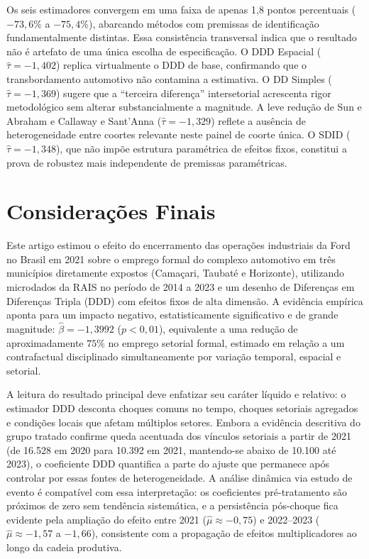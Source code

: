 \documentclass[12pt,a4paper]{article}
\begin{document}
Os seis estimadores convergem em uma faixa de apenas 1{,}8 pontos percentuais ($-73{,}6\%$ a $-75{,}4\%$), abarcando m\'etodos com premissas de identifica\c{c}\~ao fundamentalmente distintas. Essa consist\^encia transversal indica que o resultado n\~ao \'e artefato de uma \'unica escolha de especifica\c{c}\~ao. O DDD Espacial ($\hat{\tau} = -1{,}402$) replica virtualmente o DDD de base, confirmando que o transbordamento automotivo n\~ao contamina a estimativa. O DD Simples ($\hat{\tau} = -1{,}369$) sugere que a ``terceira diferen\c{c}a'' intersetorial acrescenta rigor metodol\'ogico sem alterar substancialmente a magnitude. A leve redu\c{c}\~ao de Sun e Abraham e Callaway e Sant'Anna ($\hat{\tau} = -1{,}329$) reflete a aus\^encia de heterogeneidade entre coortes relevante neste painel de coorte \'unica. O SDID ($\hat{\tau} = -1{,}348$), que n\~ao imp\~oe estrutura param\'etrica de efeitos fixos, constitui a prova de robustez mais independente de premissas param\'etricas.

\section{Considera\c{c}\~oes Finais}
\label{sec:conclusao}

Este artigo estimou o efeito do encerramento das opera\c{c}\~oes industriais da Ford no Brasil em 2021 sobre o emprego formal do complexo automotivo em tr\^es munic\'ipios diretamente expostos (Cama\c{c}ari, Taubat\'e e Horizonte), utilizando microdados da RAIS no per\'iodo de 2014 a 2023 e um desenho de Diferen\c{c}as em Diferen\c{c}as Tripla (DDD) com efeitos fixos de alta dimens\~ao. A evid\^encia emp\'irica aponta para um impacto negativo, estatisticamente significativo e de grande magnitude: $\hat{\beta} = -1{,}3992$ ($p < 0{,}01$), equivalente a uma redu\c{c}\~ao de aproximadamente $75\%$ no emprego setorial formal, estimado em rela\c{c}\~ao a um contrafactual disciplinado simultaneamente por varia\c{c}\~ao temporal, espacial e setorial.

A leitura do resultado principal deve enfatizar seu car\'ater l\'iquido e relativo: o estimador DDD desconta choques comuns no tempo, choques setoriais agregados e condi\c{c}\~oes locais que afetam m\'ultiplos setores. Embora a evid\^encia descritiva do grupo tratado confirme queda acentuada dos v\'inculos setoriais a partir de 2021 (de 16.528 em 2020 para 10.392 em 2021, mantendo-se abaixo de 10.100 at\'e 2023), o coeficiente DDD quantifica a parte do ajuste que permanece ap\'os controlar por essas fontes de heterogeneidade. A an\'alise din\^amica via estudo de evento \'e compat\'ivel com essa interpreta\c{c}\~ao: os coeficientes pr\'e-tratamento s\~ao pr\'oximos de zero sem tend\^encia sistem\'atica, e a persist\^encia p\'os-choque fica evidente pela amplia\c{c}\~ao do efeito entre 2021 ($\hat{\mu} \approx -0{,}75$) e 2022--2023 ($\hat{\mu} \approx -1{,}57$ a $-1{,}66$), consistente com a propaga\c{c}\~ao de efeitos multiplicadores ao longo da cadeia produtiva.
\end{document}
